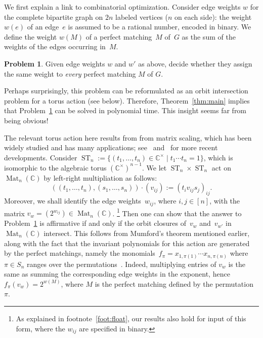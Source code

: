 \documentclass[10pt,a4paper]{article}
\DeclareMathOperator{\ST}{ST}
\DeclareMathOperator{\Mat}{Mat}
\theoremstyle{definition}
\newtheorem{problem}[theorem]{Problem}
\numberwithin{equation}{section}
\newcommand{\CC}{\mathbb{C}}
\begin{document}
We first explain a link to combinatorial optimization.
Consider edge weights $w$ for the complete bipartite graph on $2n$ labeled vertices ($n$ on each side):
the weight $w(e)$ of an edge~$e$ is assumed to be a rational number, encoded in binary.
We define the weight $w(M)$ of a perfect matching~$M$ of~$G$ as the sum of the weights of the edges occurring in~$M$.

\begin{problem}\label{prblm:MatchW}
Given edge weights $w$ and $w'$ as above, decide whether they assign the same weight to \emph{every} perfect matching $M$ of $G$.
\end{problem}

Perhaps surprisingly, this problem can be reformulated as an orbit intersection problem for
a torus action (see below).
Therefore, Theorem~\ref{thm:main} implies that Problem~\ref{prblm:MatchW} can be solved in polynomial time.
This insight seems far from being obvious!

The relevant torus action here results from from matrix scaling, which has been widely studied and has
many applications; see~\cite{Sink} and~\cite{cohen2017matrix} for more recent developments.
%
Consider $\ST_n:= \{ (t_1,\ldots,t_n) \in \CC^\times \mid t_1\cdots t_n =1\}$, which is isomorphic to the algebraic torus $(\CC^{\times})^{n-1}$.
We let $\ST_n\times\ST_n$ act on $\Mat_n(\CC)$ by left-right multipliation as follows:
\begin{equation}\label{eq:ma-scal}
 ((t_1,\ldots,t_n),(s_1,\ldots,s_n)) \cdot (v_{ij}) := (t_i v_{ij} s_j)_{ij} .
\end{equation}
Moreover, we shall identify the edge weights~$w_{ij}$, where $i,j \in [n]$, with the matrix $v_w=(2^{w_{ij}}) \in\Mat_n(\CC)$.
\footnote{As explained in footnote~\ref{foot:float}, our results also hold for input of this form, where the $w_{ij}$ are specified in binary.}
Then one can show that the answer to Problem~\ref{prblm:MatchW} is affirmative if and only if the orbit closures of~$v_w$ and~$v_{w'}$ in~$\Mat_n(\CC)$ intersect.
This follows from Mumford's theorem mentioned earlier, along with the fact that the invariant polynomials for this action are generated by the perfect matchings, namely the monomials~$f_\pi = x_{1,\pi(1)} \cdots x_{n,\pi(n)}$ where $\pi\in S_n$ ranges over the permutations~\cite[Theorem~3]{leep1999marriage}.
Indeed, multiplying entries of $v_{w}$ is the same as summing the corresponding edge weights in the exponent, hence~$f_\pi(v_w) = 2^{w(M)}$, where $M$ is the perfect matching defined by the permutation $\pi$.
\end{document}
